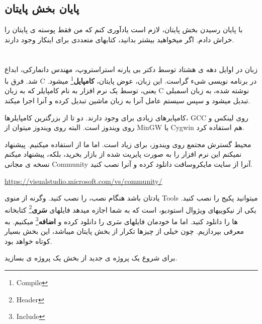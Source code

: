 \documentclass[14pt,a4paper]{memoir}
\begin{document}
	 \subsection{پایان بخش پایتان}
	 
	 با پایان رسیدن بخش پایتان، لازم است یادآوری کنم که من فقط پوسته ی پایتان را خراش دادم. اگر میخواهید بیشتر بدانید، کتابهای متعددی برای اینکار وجود دارند.
	 
	 
	 
	 \section{}\label{cpp}
	 زبان  در اوایل دهه ی هشتاد توسط دکتر بی ‌یارنه استراستروپ، مهندس دانمارکی، ابداع شد. فرق  با C در برنامه نویسی شیء گراست. این زبان، عوض پایتان، \textbf{کامپایل}\footnote{Compile} میشود. یعنی، توسط یک نرم افزار به نام کامپایلر که به زبان C نوشته شده، به زبان اسمبلی تبدیل میشود و سپس سیستم عامل آنرا به زبان ماشین تبدیل کرده و آنرا اجرا میکند. 
	 
	 
	 کامپایرهای زیادی برای  وجود دارند. دو تا از بزرگترین کامپایلرها، GCC روی لینکس و  روی ویندوز است. البته روی ویندوز میتوان از MinGW یا Cygwin هم استفاده کرد.
	  
	 محیط گسترش مجتمع روی ویندوز، برای  زیاد است. اما ما از  استفاده میکنیم. پیشنهاد نمیکنم این نرم افزار را به صورت پایریت شده از بازار بخرید، بلکه، پیشنهاد میکنم نسخه ی مجانی Community آنرا از سایت مایکروسافت دانلود کرده و آنرا نصب کنید.
	 
	 \url{https://visualstudio.microsoft.com/vs/community/}
	 
	 
	  یادتان باشد هنگام نصب،  را نصب کنید. وگرنه از منوی Tools میتوانید پکیج را نصب کنید. یکی از نیکوییهای ویژوال استودیو،  است که به شما اجازه میدهد فایلهای \textbf{سَری}\footnote{Header} کتابخانه ها را دانلود کنید. اما ما خودمان فایلهای سَری را دانلود کرده و \textbf{اضافه}\footnote{Include} میکنیم. به معرفی  بپردازیم. چون خیلی از چیزها تکرار از بخش پایتان میباشد، این بخش بسیار کوتاه خواهد بود.
	  
	 برای شروع یک پروژه ی جدید از بخش  یک پروژه ی  بسازید. 
	 
\end{document}
